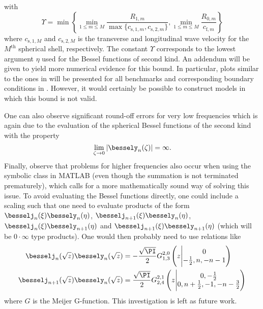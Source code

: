 with
\begin{equation*}
	\Upsilon = \min\left\{\min_{1\leq m\leq M}\frac{R_{1,m}}{\max\{c_{\mathrm{s,1},m},c_{\mathrm{s,2},m}\}},\min_{1\leq m\leq M}\frac{R_{0,m}}{c_{\mathrm{f},m}}\right\}
\end{equation*}
where $c_{\mathrm{s,1},M}$ and $c_{\mathrm{s,2},M}$ is the transverse and longitudinal wave velocity for the $M^{\mathrm{th}}$ spherical shell, respectively. The constant $\Upsilon$ corresponds to the lowest argument $\eta$ used for the Bessel functions of second kind. An addendum will be given to yield more numerical evidence for this bound. In particular, plots similar to the ones in  will be presented for all benchmarks and corresponding boundary conditions in . However, it would certainly be possible to construct models in which this bound is not valid.

One can also observe significant round-off errors for very low frequencies which is again due to the evaluation of the spherical Bessel functions of the second kind with the property
\begin{equation}
	\lim_{\zeta\to 0} |\bessely_n(\zeta)| = \infty.
\end{equation}
Finally, observe that problems for higher frequencies also occur when using the symbolic class in MATLAB (even though the summation is not terminated prematurely), which calls for a more mathematically sound way of solving this issue. To avoid evaluating the Bessel functions directly, one could include a scaling such that one need to evaluate products of the form $\besselj_n(\xi)\bessely_n(\eta)$, $\besselj_{n+1}(\xi)\bessely_n(\eta)$, $\besselj_n(\xi)\bessely_{n+1}(\eta)$ and $\besselj_{n+1}(\xi)\bessely_{n+1}(\eta)$ (which will be $0\cdot\infty$ type products). One would then probably need to use relations like~\cite[\href{http://functions.wolfram.com/03.21.26.0047.01}{03.21.26.0047.01} and \href{http://functions.wolfram.com/03.21.26.0049.01}{03.21.26.0049.01}]{WolframResearch2016m}
\begin{align}
\besselj_n(\sqrt{z})\bessely_n(\sqrt{z}) &=-\frac{\sqrt{\PI}}{2}G_{1,3}^{2,0}\left(z\Bigg\vert\begin{matrix}
	0\\
	-\frac{1}{2}, n, -n-1
	\end{matrix}\right)\\
	\besselj_{n+1}(\sqrt{z})\bessely_n(\sqrt{z}) &=\frac{\sqrt{\PI}}{2}G_{2,4}^{2,1}\left(z\Bigg\vert\begin{matrix}
	0,-\frac{1}{2}\\
	0, n+\frac{1}{2},-1,-n-\frac{3}{2}
	\end{matrix}\right)
\end{align}
where $G$ is the Meijer G-function. This investigation is left as future work.





